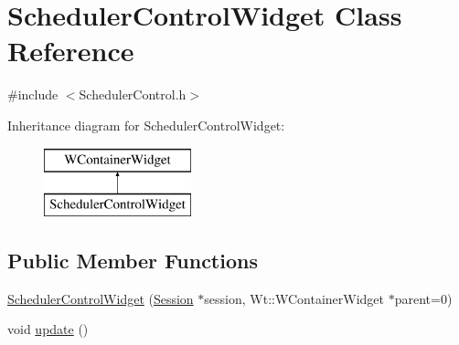 \hypertarget{class_scheduler_control_widget}{}\section{Scheduler\+Control\+Widget Class Reference}
\label{class_scheduler_control_widget}


{\ttfamily \#include $<$Scheduler\+Control.\+h$>$}

Inheritance diagram for Scheduler\+Control\+Widget\+:\begin{figure}[H]
\begin{center}
\leavevmode
\includegraphics[height=2.000000cm]{class_scheduler_control_widget}
\end{center}
\end{figure}
\subsection*{Public Member Functions}
\begin{DoxyCompactItemize}
\item 
\hyperlink{class_scheduler_control_widget_a88824ef71ef84e9e5bdb85ab3f4f9952}{Scheduler\+Control\+Widget} (\hyperlink{class_session}{Session} $\ast$session, Wt\+::\+W\+Container\+Widget $\ast$parent=0)
\item 
void \hyperlink{class_scheduler_control_widget_acca1c74b4dc6fa16c079da6b2e946f4b}{update} ()
\end{DoxyCompactItemize}
